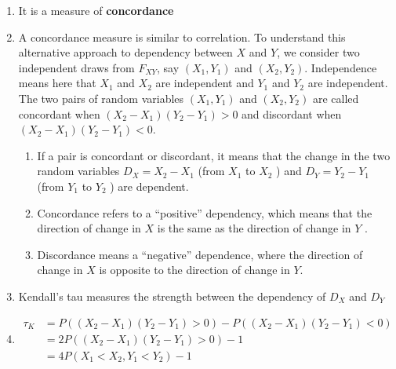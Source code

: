 \begin{enumerate}
    \item It is a measure of \textbf{concordance}
    \hfill \cite{statistics/book/Statistics-for-Data-Scientists/Maurits-Kaptein}

    \item 
    \begin{definition}
        A concordance measure is similar to correlation. 
        To understand this alternative approach to dependency between $X$ and $Y$, we consider two independent draws from $F _{X Y}$, say $(X_1, Y_1)$ and $(X_2, Y_2)$. 
        Independence means here that $X_1$ and $X_2$ are independent and $Y_1$ and $Y_2$ are independent. 
        The two pairs of random variables $(X_1, Y_1)$ and $(X_2, Y_2)$ are called concordant when $(X_2 - X_1)(Y_2 - Y_1) > 0$ and discordant when $(X_2 - X_1)(Y_2 - Y_1) < 0$. 
        \hfill \cite{statistics/book/Statistics-for-Data-Scientists/Maurits-Kaptein}
    \end{definition}
    \begin{enumerate}
        \item If a pair is concordant or discordant, it means that the change in the two random variables $D_X = X_2 - X_1$ (from $X_1$ to $X_2$ ) and $D_Y = Y_2 - Y_1$ (from $Y_1$ to $Y_2$ ) are dependent. 
        \hfill \cite{statistics/book/Statistics-for-Data-Scientists/Maurits-Kaptein}
        
        \item Concordance refers to a “positive” dependency, which means that the direction of change in $X$ is the same as the direction of change in $Y$ . 
        \hfill \cite{statistics/book/Statistics-for-Data-Scientists/Maurits-Kaptein}
        
        \item Discordance means a “negative” dependence, where the direction of change in $X$ is opposite to the direction of change in $Y$.
        \hfill \cite{statistics/book/Statistics-for-Data-Scientists/Maurits-Kaptein}
    \end{enumerate}

    \item Kendall’s tau measures the strength between the dependency of $D_X$ and $D_Y$ 
    \hfill \cite{statistics/book/Statistics-for-Data-Scientists/Maurits-Kaptein}

    \item 
    $
        \begin{aligned}
            \tau_K 
            & = P((X_2 - X_1)(Y_2 - Y_1) > 0) - P((X_2 - X_1)(Y_2 - Y_1) < 0) \\
            &= 2 P((X_2 - X_1)(Y_2 - Y_1) > 0) - 1 \\
            &= 4 P(X_1 < X_2, Y_1 < Y_2) - 1
        \end{aligned}
    $
    \hfill \cite{statistics/book/Statistics-for-Data-Scientists/Maurits-Kaptein}


\end{enumerate}
